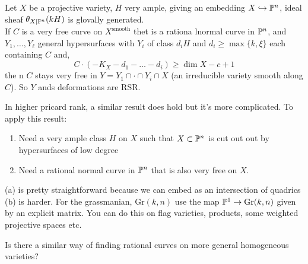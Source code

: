 \documentclass[12pt]{article}
\begin{document}
\begin{thm}
Let $X$ be a projective variety, $H$ very ample, giving an embedding $X \embed \P^n$, ideal sheaf $\theta_{X|\P^n}(k H)$ is glovally generated. 
\bigskip\\
If $C$ is a very free curve on $X^{\text{smooth}}$ thet is a rationa lnormal curve in $\P^n$, and $Y_1, \dots, Y_\ell$ general hypersurfaces with $Y_i$ of class $d_i H$ and $d_i \ge \max \{ k, \xi \}$ each containing $C$ and,
\[ C \cdot (-K_X - d_1 - \dots - d_i) \ge \dim{X} - c + 1 \]
the n $C$ stays very free in $Y = Y_1 \cap \cdot \cap Y_i \cap X$ (an irreducible variety smooth along $C$). So $Y$ ands deformations are RSR.
\end{thm}

\begin{rmk}
In higher pricard rank, a similar result does hold but it's more complicated. To apply this result:
\begin{enumerate}
\item Need a very ample class $H$ on $X$ such that $X \subset \P^n$ is cut out out by hypersurfaces of low degree
\item Need a rational normal curve in $\P^n$ that is also very free on $X$.
\end{enumerate}
\end{rmk}

\begin{rmk}
(a) is pretty straightforward because we can embed as an intersection of quadrics
\bigskip\\
(b) is harder. For the grassmanian, $\mathrm{Gr}(k,n)$ use the map $\P^1 \to \mathrm{Gr}(k,n)$ given by an explicit matrix. You can do this on flag varieties, products, some weighted projective spaces etc.
\end{rmk}

\begin{rmk}
Is there a similar way of finding rational curves on more general homogeneous varieties?
\end{rmk}
\end{document}
